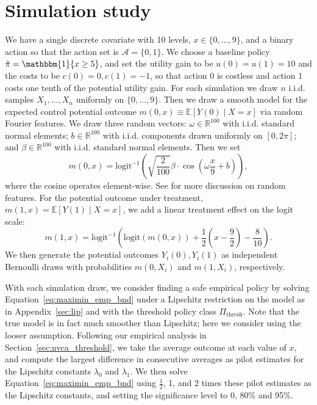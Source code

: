 \documentclass[12pt]{article}
\theoremstyle{definition}
\newcommand{\R}{\ensuremath{\mathbb{R}}}
\newcommand{\bbone}{\ensuremath{\mathbbm{1}}}
\newcommand{\E}{\ensuremath{\mathbb{E}}}
\newcommand{\logit}{\text{logit}}
\newcommand{\<}{\langle}
\renewcommand{\>}{\rangle}
\begin{document}
\section{Simulation study}
\label{sec:sims}



We have a single discrete covariate with 10 levels, $x \in \{0,\ldots,9\}$,
and a binary action so that the action set is $\mathcal{A} = \{0,1\}$.
We choose a baseline policy $\tilde{\pi} = \bbone\{x \geq 5\}$, and set the
utility gain to be $u(0) = u(1) = 10$ and the costs to be $c(0) = 0, c(1) = -1$,
so that action 0 is costless and action 1 costs one tenth of the potential
utility gain.
For each
simulation we draw $n$ i.i.d. samples $X_1,\ldots,X_n$ uniformly on
$\{0,\ldots,9\}$. Then we draw a smooth model for the expected control potential outcome
$m(0,x) \equiv \E[Y(0) \mid X = x]$ via random Fourier features.
We draw three random vectors: $\omega \in \R^{100}$ with i.i.d. standard normal
elements; $b \in \R^{100}$ with i.i.d. components drawn uniformly
on $[0,2\pi]$; and $\beta \in \R^{100}$ with i.i.d. standard normal elements.
Then we set
\[
  m(0,x) = \logit^{-1}\left(\sqrt{\frac{2}{100}} \beta \cdot  \cos\left(\omega \frac{x}{9} + b\right)\right),
\]
where the cosine operates element-wise. See \citet{Rahimi2008_random_features} for more discussion on random features.
For the potential outcome under treatment, $m(1, x) = \E[Y(1) \mid X = x]$, we add a linear treatment effect on the logit scale:
\[
  m(1,x) = \logit^{-1}\left(\logit\left(m(0,x)\right) + \frac{1}{2}\left(x - \frac{9}{2}\right) - \frac{8}{10}\right).
\]
We then generate the potential outcomes $Y_i(0),Y_i(1)$ as independent Bernoulli draws with probabilities $m(0, X_i)$ and $m(1, X_i)$, respectively.

With each simulation draw, we consider finding a safe empirical policy by solving
Equation~\eqref{eq:maximin_emp_bnd} under a Lipschitz restriction on the model as in
Appendix~\ref{sec:lip} and with the threshold policy class $\Pi_\text{thresh}$. Note that the true model is in fact much smoother than
Lipschitz; here we consider using the looser assumption. 
Following our empirical analysis in
Section~\ref{sec:nvca_threshold}, we take the average outcome at each
value of $x$, and compute the largest difference in consecutive averages as
pilot estimates for the Lipschitz constants $\lambda_0$ and $\lambda_1$.
We then solve Equation~\eqref{eq:maximin_emp_bnd} using  $\frac{1}{2}$, 1, and 2 times
these pilot estimates as the Lipschitz constants, and setting the significance
level to 0, 80\% and 95\%.
\end{document}
